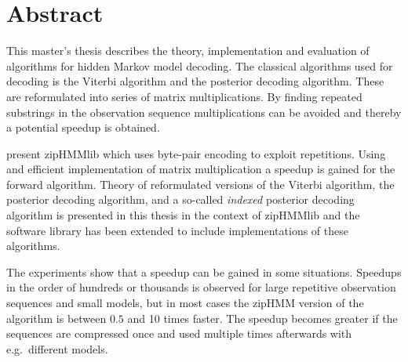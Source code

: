 \chapter{Abstract}

This master's thesis describes the theory, implementation and evaluation of
algorithms for hidden Markov model decoding. The classical algorithms used
for decoding is the Viterbi algorithm and the posterior decoding algorithm.
These are reformulated into series of matrix multiplications. By finding
repeated substrings in the observation sequence multiplications can be
avoided and thereby a potential speedup is obtained.

\citet{sand2013ziphmmlib} present zipHMMlib which uses byte-pair encoding to
exploit repetitions. Using and efficient implementation of matrix
multiplication a speedup is gained for the forward algorithm. Theory of
reformulated versions of the Viterbi algorithm, the posterior decoding
algorithm, and a so-called \emph{indexed} posterior decoding algorithm is
presented in this thesis in the context of zipHMMlib and the software library
has been extended to include implementations of these algorithms.

The experiments show that a speedup can be gained in some situations. Speedups
in the order of hundreds or thousands is observed for large repetitive
observation sequences and small models, but in most cases the zipHMM version of
the algorithm is between $0.5$ and 10 times faster. The speedup becomes
greater if the sequences are compressed once and used multiple times afterwards
with e.g.\ different models.
